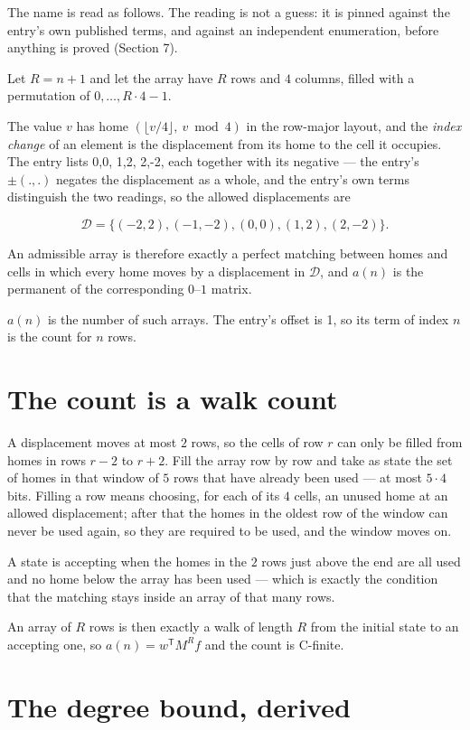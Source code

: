 \documentclass[11pt]{article}
\theoremstyle{definition}
\begin{document}
The name is read as follows. The reading is not a guess: it is pinned against the entry's own published terms, and against an independent enumeration, before anything is proved (Section 7).

Let $R = n + 1$ and let the array have $R$ rows and $4$ columns, filled with a permutation of $0,\dots,R\cdot4-1$.

The value $v$ has home $(\lfloor v/4\rfloor,\ v \bmod 4)$ in the row-major layout, and the {\itshape index change} of an element is the displacement from its home to the cell it occupies. The entry lists 0,0, 1,2, 2,-2, each together with its negative --- the entry's $\pm(.,.)$ negates the displacement as a whole, and the entry's own terms distinguish the two readings, so the allowed displacements are

\[\mathcal{D} = \{(-2,2), (-1,-2), (0,0), (1,2), (2,-2)\}.\]

An admissible array is therefore exactly a perfect matching between homes and cells in which every home moves by a displacement in $\mathcal{D}$, and $a(n)$ is the permanent of the corresponding $0$--$1$ matrix.

$a(n)$ is the number of such arrays. The entry's offset is 1, so its term of index $n$ is the count for $n$ rows.

\section{The count is a walk count}

A displacement moves at most $2$ rows, so the cells of row $r$ can only be filled from homes in rows $r-2$ to $r+2$. Fill the array row by row and take as state the set of homes in that window of $5$ rows that have already been used --- at most $5\cdot4$ bits. Filling a row means choosing, for each of its $4$ cells, an unused home at an allowed displacement; after that the homes in the oldest row of the window can never be used again, so they are required to be used, and the window moves on.

A state is accepting when the homes in the $2$ rows just above the end are all used and no home below the array has been used --- which is exactly the condition that the matching stays inside an array of that many rows.

An array of $R$ rows is then exactly a walk of length $R$ from the initial state to an accepting one, so $a(n) = w^{\mathsf T}M^{R}f$ and the count is C-finite.

\section{The degree bound, derived}
\end{document}
